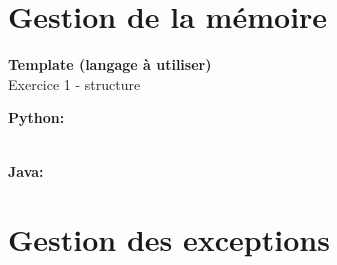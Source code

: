  \begin{comment}
 \begin{Exercice}[5 minutes] \textbf{Portée des variables (à compléter)}\\
    Exercice 1 - structure \\
    
     \begin{conseil}
         
     \end{conseil}
     \begin{solution}
     
     \textbf{Python:} 
     
     \textbf{\\Java:} 
        
         
     \end{solution}   
 \end{Exercice}
\end{comment}

\section{Gestion de la mémoire}

\begin{Exercice}[5 minutes] \textbf{Template (langage à utiliser)}\\
    Exercice 1 - structure \\
    
     \begin{conseil}
         
     \end{conseil}
     \begin{solution}
     
     \textbf{Python:} 
     
     \textbf{\\Java:} 
        
         
     \end{solution}   
 \end{Exercice}

\section{Gestion des exceptions}

